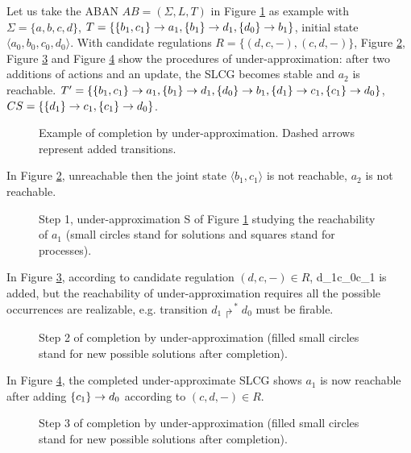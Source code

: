 Let us take the ABAN $AB=(\Sigma, L, T)$ in Figure \ref{ExUnder} as example with $\Sigma= \{a,b,c,d\}$, $T=\{\acm{b_1,c_1}{a_0}{a_1}, \acm{b_1}{d_0}{d_1}, \acm{d_0}{b_0}{b_1}\}$, initial state $\langle a_0,b_0,c_0,d_0\rangle$.
With candidate regulations $R=\{(d,c,-),(c,d,-)\}$, Figure \ref{Under1}, Figure \ref{Under2} and Figure \ref{Under3} show the procedures of under-approximation: after two additions of actions and an update, the SLCG becomes stable and $a_2$ is reachable.
$T'=\{\acm{b_1,c_1}{a_0}{a_1}, \acm{b_1}{d_0}{d_1}, \acm{d_0}{b_0}{b_1},\acm{d_1}{c_0}{c_1}, \acm{c_1}{d_1}{d_0}\}$, $CS=\{\acm{d_1}{c_0}{c_1}, \acm{c_1}{d_1}{d_0}\}$.

\begin{figure}[ht]
\centering

\caption[Completion by under-approximation]{Example of completion by under-approximation. Dashed arrows represent added transitions.}\label{ExUnder}
\end{figure}

In Figure \ref{Under1},  unreachable then the joint state $\langle b_1, c_1\rangle$ is not reachable, $a_2$ is not reachable.

\begin{figure}[ht]
\centering

\caption[Operations on SLCG(1)]{Step 1, under-approximation S of Figure \ref{ExUnder} studying the reachability of $a_1$ (small circles stand for solutions and squares stand for processes). }\label{Under1}
\end{figure}

In Figure \ref{Under2}, according to candidate regulation ${(d,c,-)}\in R$, \ac{d_1}{c_0}{c_1} is added, but the reachability of under-approximation requires all the possible occurrences are realizable, e.g. transition $d_1\Rsh^*d_0$ must be firable.

\begin{figure}[ht]
\centering

\caption[Operations on SLCG(2)]{Step 2 of completion by under-approximation (filled small circles stand for new possible solutions after completion).}\label{Under2}
\end{figure}

In Figure \ref{Under3}, the completed under-approximate SLCG shows $a_1$ is now reachable after adding $\acm{c_1}{d_1}{d_0}$ according to ${(c,d,-)}\in R$.

\begin{figure}[ht]
\centering

\caption[Operations on SLCG(3)]{Step 3 of completion by under-approximation (filled small circles stand for new possible solutions after completion).}\label{Under3}
\end{figure}

